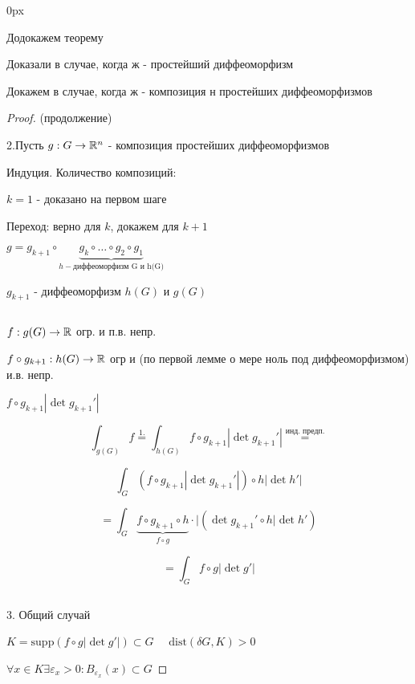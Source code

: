 
\parindent 0px

\usepackage{amsfonts, amssymb, amsmath, mathtools, amsthm}  %
\usepackage{mathrsfs}


\renewcommand{\baselinestretch}{1.3} 
\setcounter{lemma}{19}


    Додокажем теорему

    Доказали в случае, когда ж - простейший диффеоморфизм 
    
    Докажем в случае, когда ж - композиция н простейших диффеоморфизмов
    
    \begin{proof} (продолжение)
        
        2.Пусть $g: G \to \mathbb{R}^n$ - композиция простейших диффеоморфизмов
        
        Индуция. Количество композиций: 
        
        $k=1$ - доказано на первом шаге

        Переход: верно для $k$, докажем для $k+1$

        $g = g_{k+1}\circ \underbrace{g_k \circ \dotsc \circ g_2 \circ g_1}_{h - \text{диффеоморфизм G и h(G)}}$

        $g_{k+1}$ - диффеоморфизм $h(G)$ и $g(G)$

        \par $ $

        $f: g(G) \to \mathbb{R} $ огр. и п.в. непр.

        $f\circ g_{k+1}:h(G) \to \mathbb{R}$ огр и (по первой лемме о мере ноль под диффеоморфизмом) и.в. непр.

        $f\circ g_{k+1} |\det g_{k+1}'|$

        $$\int_{g(G)} f \overset{1.}{=} \int_{h(G)} f \circ g_{k+1} | \det g_{k+1}'| \overset{\text{инд. предп.}}{=} $$

        $$\int_G (f\circ g_{k+1} | \det g_{k+1}'|) \circ h |\det h'|$$

        $$= \int_G \underbrace{f\circ g_{k+1}\circ h}_{f \circ g} \cdot | (\det g_{k+1}' \circ h |\det h')$$

        $$=\int_G f \circ g |\det g'|$$

        \par $ $

        3. Общий случай

        $K = \text{supp}(f\circ g | \det g'|) \subset G \quad $
        $\text{dist}(\delta G, K) > 0$

        $\forall x \in K \exists \varepsilon_x > 0: B_{\varepsilon_x}(x) \subset G$


\end{proof}
